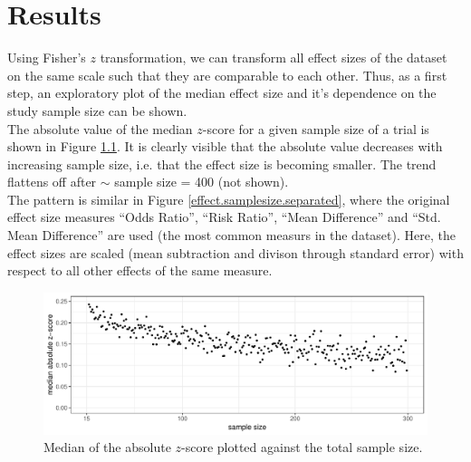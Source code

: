 \documentclass[11pt,a4paper,twoside]{book}\usepackage[]{graphicx}\usepackage[]{color}
\newenvironment{knitrout}{}{} %
\begin{document}









\chapter{Results} \label{ch:Results}





Using Fisher's $z$ transformation, we can transform all effect sizes of the dataset on the same scale such that they are comparable to each other. Thus, as a first step, an exploratory plot of the median effect size and it's dependence on the study sample size can be shown. \\
The absolute value of the median $z$-score for a given sample size of a trial is shown in Figure \ref{z.samplesize}. It is clearly visible that the absolute value decreases with increasing sample size, i.e. that the effect size is becoming smaller. The trend flattens off after $\sim$ sample size = 400 (not shown). \\
The pattern is similar in Figure \ref{effect.samplesize.separated}, where the original effect size measures ``Odds Ratio'', ``Risk Ratio'', ``Mean Difference'' and ``Std. Mean Difference'' are used (the most common measurs in the dataset). Here, the effect sizes are scaled (mean subtraction and divison through standard error) with respect to all other effects of the same measure. 

\begin{figure}
\begin{knitrout}
\color{fgcolor}

{\centering \includegraphics[width=\textwidth-3cm]{figure/ch03_figunnamed-chunk-11-1} 

}



\end{knitrout}
\caption{Median of the absolute $z$-score plotted against the total sample size.}
\label{z.samplesize}
\end{figure}
\end{document}
